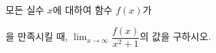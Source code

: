 모든 실수 $x$에 대하여 함수 $f(x)$가\par\smallskip{}\par\smallskip\noindent 을 만족시킬 때, $\displaystyle\lim_{x\to\infty}\dfrac{f(x)}{x^2+1}$의 값을 구하시오.
